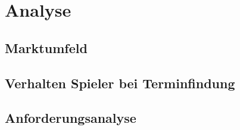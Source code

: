 \chapter{Analyse}

\section{Marktumfeld}

\section{Verhalten Spieler bei Terminfindung}

\section{Anforderungsanalyse}

